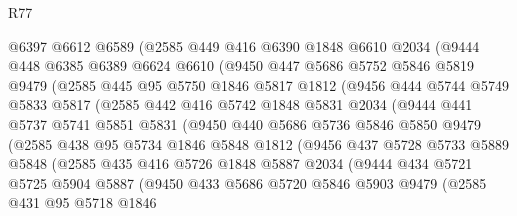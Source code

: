 \begin{lexlean}{R77}
\begin{coremodule}
        @6397
        @6612
        @6589
        (@2585
          @449
          @416
          @6390
          @1848
          @6610
          @2034
          (@9444
            @448
            @6385
            @6389
            @6624
            @6610
            (@9450
              @447
              @5686
              @5752
              @5846
              @5819
              @9479
              (@2585
                @445
                @95
                @5750
                @1846
                @5817
                @1812
                (@9456
                  @444
                  @5744
                  @5749
                  @5833
                  @5817
                  (@2585
                    @442
                    @416
                    @5742
                    @1848
                    @5831
                    @2034
                    (@9444
                      @441
                      @5737
                      @5741
                      @5851
                      @5831
                      (@9450
                        @440
                        @5686
                        @5736
                        @5846
                        @5850
                        @9479
                        (@2585
                          @438
                          @95
                          @5734
                          @1846
                          @5848
                          @1812
                          (@9456
                            @437
                            @5728
                            @5733
                            @5889
                            @5848
                            (@2585
                              @435
                              @416
                              @5726
                              @1848
                              @5887
                              @2034
                              (@9444
                                @434
                                @5721
                                @5725
                                @5904
                                @5887
                                (@9450
                                  @433
                                  @5686
                                  @5720
                                  @5846
                                  @5903
                                  @9479
                                  (@2585
                                    @431
                                    @95
                                    @5718
                                    @1846

\end{coremodule}
\end{lexlean}
